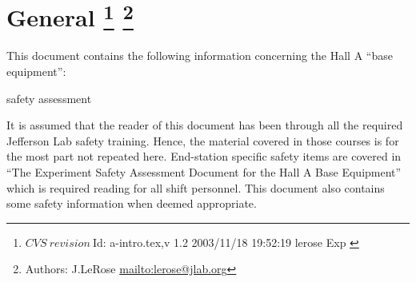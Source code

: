 \section[General]{General
\footnote{
  $CVS~revision~ $Id: a-intro.tex,v 1.2 2003/11/18 19:52:19 lerose Exp $ $ 
}
\footnote{Authors: J.LeRose \url{mailto:lerose@jlab.org}}
} 

 This document contains the following information concerning the Hall
 A ``base equipment'':
 \begin{list}{--}{\setlength{\itemsep}{0.cm}}
    \item safety assessment 
 \end{list}


  It is assumed that the reader of this document has
  been through all the required Jefferson Lab safety training. Hence,
  the material covered in those courses is for the most part not
  repeated here. End-station specific safety items are covered in
  ``The Experiment Safety Assessment Document for the Hall A Base
  Equipment'' which is required reading for all shift personnel.  This
  document also contains some safety information when deemed
  appropriate.
	

